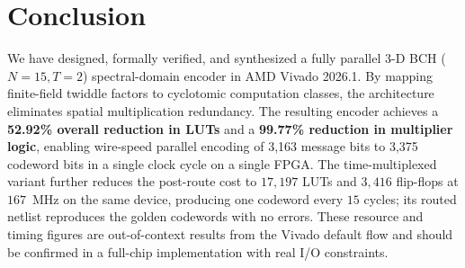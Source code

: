 \documentclass[11pt,a4paper]{article}
\begin{document}
\section{Conclusion}

We have designed, formally verified, and synthesized a fully parallel 3-D BCH ($N=15, T=2$) spectral-domain encoder in AMD Vivado 2026.1. By mapping finite-field twiddle factors to cyclotomic computation classes, the architecture eliminates spatial multiplication redundancy. The resulting encoder achieves a \textbf{52.92\% overall reduction in LUTs} and a \textbf{99.77\% reduction in multiplier logic}, enabling wire-speed parallel encoding of 3,163 message bits to 3,375 codeword bits in a single clock cycle on a single FPGA. The time-multiplexed variant further reduces the post-route cost to $17,197$ LUTs and $3,416$ flip-flops at $167$~MHz on the same device, producing one codeword every $15$ cycles; its routed netlist reproduces the golden codewords with no errors. These resource and timing figures are out-of-context results from the Vivado default flow and should be confirmed in a full-chip implementation with real I/O constraints.
\end{document}

